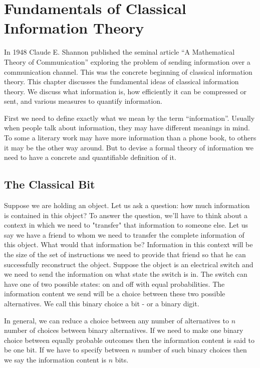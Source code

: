 \chapter{Fundamentals of Classical Information Theory}

\par In 1948 Claude E. Shannon published the seminal article “A Mathematical Theory of Communication” exploring the problem of sending information over a communication channel. This was the concrete beginning of classical information theory. This chapter discusses the fundamental ideas of classical information theory. We discuss what information is, how efficiently it can be compressed or sent, and various measures to quantify information.

\par First we need to define exactly what we mean by the term “information”. Usually when people talk about information, they may have different meanings in mind. To some a literary work may have more information than a phone book, to others it may be the other way around. But to devise a formal theory of information we need to have a concrete and quantifiable definition of it.

\section{The Classical Bit}
\par Suppose we are holding an object. Let us ask a question: how much information is contained in this object? To answer the question, we'll have to think about a context in which we need to "transfer" that information to someone else. Let us say we have a friend to whom we need to transfer the complete information of this object. What would that information be? Information in this context will be the size of the set of instructions we need to provide that friend so that he can successfully reconstruct the object.
Suppose the object is an electrical switch and we need to send the information on what state the switch is in. The switch can have one of two possible states: on and off with equal probabilities. The information content we send will be a choice between these two possible alternatives. We call this binary choice a bit - or a binary digit.
\par In general, we can reduce a choice between any number of alternatives to $n$ number of choices between binary alternatives. If we need to make one binary choice between equally probable outcomes then the information content is said to be one bit. If we have to specify between $n$ number of such binary choices then we say the information content is $n$ bits.


